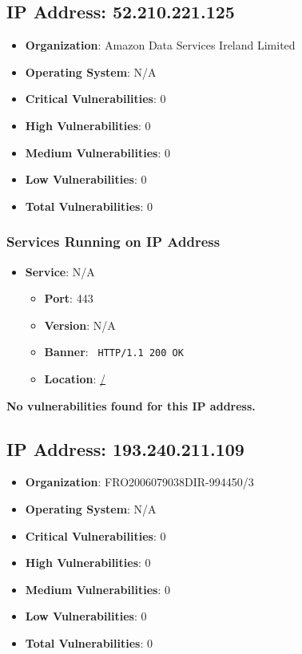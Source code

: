 \documentclass{article}
\begin{document}
\subsection*{IP Address: 52.210.221.125}

\begin{itemize}
    \item \textbf{Organization}: Amazon Data Services Ireland Limited
    \item \textbf{Operating System}:  N/A 
    \item \textbf{Critical Vulnerabilities}: 0
    \item \textbf{High Vulnerabilities}: 0
    \item \textbf{Medium Vulnerabilities}: 0
    \item \textbf{Low Vulnerabilities}: 0
    \item \textbf{Total Vulnerabilities}: 0
\end{itemize}

\subsubsection*{Services Running on IP Address}

\begin{itemize}
    
        \item \textbf{Service}: N/A
        \begin{itemize}
            \item \textbf{Port}: 443
            \item \textbf{Version}:  N/A 
            \item \textbf{Banner}: \texttt{
                HTTP/1.1 200 OK
            }
            \item \textbf{Location}: \href{ / }{ / }
        \end{itemize}
    
\end{itemize}


\textbf{No vulnerabilities found for this IP address.}




\clearpage



\subsection*{IP Address: 193.240.211.109}

\begin{itemize}
    \item \textbf{Organization}: FRO2006079038DIR-994450/3
    \item \textbf{Operating System}:  N/A 
    \item \textbf{Critical Vulnerabilities}: 0
    \item \textbf{High Vulnerabilities}: 0
    \item \textbf{Medium Vulnerabilities}: 0
    \item \textbf{Low Vulnerabilities}: 0
    \item \textbf{Total Vulnerabilities}: 0
\end{itemize}
\end{document}
